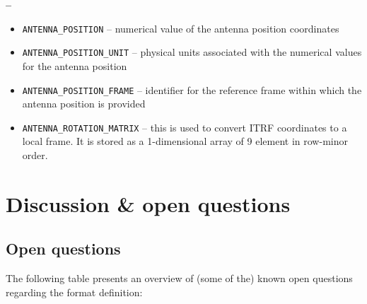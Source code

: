 \documentclass[a4paper,10pt,bibtotoc]{scrartcl}
\begin{document}
\begin{list}{\textbf{--}}{}
  \begin{itemize} \parskip 0pt
  \item \verb|ANTENNA_POSITION| -- numerical value of the antenna position
    coordinates
  \item \verb|ANTENNA_POSITION_UNIT| -- physical units associated with the numerical
    values for the antenna position
  \item \verb|ANTENNA_POSITION_FRAME| -- identifier for the reference frame within
    which the antenna position is provided
  \item \verb|ANTENNA_ROTATION_MATRIX| -- this is used to convert ITRF
    coordinates to a local frame. It is stored as a 1-dimensional array of 9
    element in row-minor order.
  \end{itemize}
\end{list}

\clearpage


\clearpage

\appendix

\section{Discussion \& open questions}

\subsection{Open questions}

The following table presents an overview of (some of the) known open
questions regarding the format definition:
\end{document}
